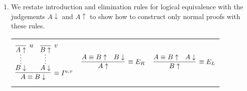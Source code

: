 \documentclass[11pt,letterpaper]{article}
\newcommand{\neut}{\uparrow}
\newcommand{\norm}{\downarrow}
\begin{document}
\begin{enumerate}
\begin{proof}
\begin{description}
                    This proof is essentially the same as for $\equiv E_L$ so
                    we will omit it.
            \end{description}
        \end{proof}

    \item
        We restate introduction and elimination rules for logical equivalence
        with the judgements $A\norm$ and $A\neut$ to show how to construct only
        normal proofs with these rules.

        \begin{center}
            \begin{tabular}{c c c}
                $$
                \infer[\equiv I^{u,v}]{A \equiv B \norm}{
                    \infer*{B \norm}{
                        \infer[u]{A \neut}{}
                    }
                    &
                    \infer*{A \norm}{
                        \infer[v]{B \neut}{}
                    }
                }
                $$
                &
                $$
                \infer[\equiv E_R]{A \neut}{
                    A \equiv B \neut
                    &
                    B \norm
                }
                $$
                &
                $$
                \infer[\equiv E_L]{B \neut}{
                    A \equiv B \neut
                    &
                    A \norm
                }
                $$
            \end{tabular}
        \end{center}

\end{enumerate}
\end{document}
